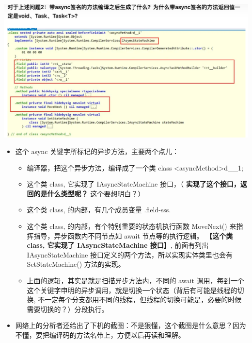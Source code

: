 \documentclass[9pt, b5paper]{article}
\begin{document}
\begin{center}
\includegraphics[width=.9\linewidth]{./pic/et3_20230609_110634.png}
\end{center}
\begin{itemize}
\item 这个 async 关键字所标记的异步方法，主要两个点儿： 
\begin{itemize}
\item 编译器，把这个异步方法，编译成了一个类 class <asyncMethod>d\_\_1;
\item 这个类 class, 它实现了 IAsyncStateMachine 接口，（ \textbf{实现了这个接口，返回的是什么类型呢？} 这个要想明白？）
\item 这个类 class, 的内部，有几个成员变量 .field-sss.
\item 这个类 class, 的内部，有个特别重要的状态机执行函数 MoveNext() 来指挥指导，异步函数内不同节点如 await 节点等的执行逻辑。 \textbf{【这个类 class, 它实现了 IAsyncStateMachine 接口】}, 前面有列出 IAsyncStateMachine 接口定义的两个方法，所以实现实体类里也会有SetStateMachine() 方法的实现。
\item 上面的逻辑，其实是就是扫描异步方法内，不同的 await 调用，每到一个这个关键字申明的异步调用，就是切换一个状态（背后有可能是线程的切换, 不一定每个分支都用不同的线程，但线程的切换可能是，必要的时候需要切换的？）分段执行。
\end{itemize}
\item 网络上的分析者还给出了下机的截图：不是狠懂，这个截图是什么意思？因为不懂，要把编译码的方法名带上，方便以后再读和理解。
\end{itemize}
\end{document}

